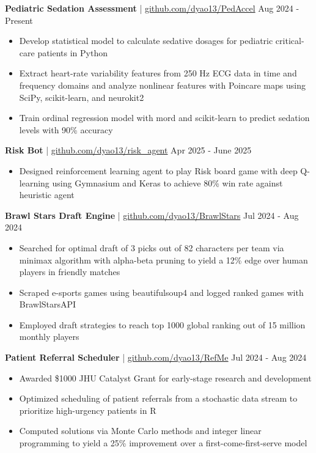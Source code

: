 \documentclass[11pt]{article}       %
\begin{document}
\textbf{Pediatric Sedation Assessment} | \href{https://github.com/dyao13/PedAccel}{github.com/dyao13/PedAccel} \hfill Aug 2024 - Present \vspace{-9pt} \\
\begin{itemize}
  \item Develop statistical model to calculate sedative dosages for pediatric critical-care patients in Python
  \item Extract heart-rate variability features from 250 Hz ECG data in time and frequency domains and analyze nonlinear features with Poincare maps using SciPy, scikit-learn, and neurokit2
  \item Train ordinal regression model with mord and scikit-learn to predict sedation levels with 90\% accuracy
\end{itemize}

\textbf{Risk Bot} | \href{https://github.com/dyao13/risk_agent}{github.com/dyao13/risk\_agent} \hfill Apr 2025 - June 2025 \vspace{-9pt} \\
\begin{itemize}
  \item Designed reinforcement learning agent to play Risk board game with deep Q-learning using Gymnasium and Keras to achieve 80\% win rate against heuristic agent
\end{itemize}

\textbf{Brawl Stars Draft Engine} | \href{https://github.com/dyao13/BrawlStars}{github.com/dyao13/BrawlStars} \hfill Jul 2024 - Aug 2024 \vspace{-9pt} \\
\begin{itemize}
  \item Searched for optimal draft of 3 picks out of 82 characters per team via minimax algorithm with alpha-beta pruning to yield a 12\% edge over human players in friendly matches
  \item Scraped e-sports games using beautifulsoup4 and logged ranked games with BrawlStarsAPI
  \item Employed draft strategies to reach top 1000 global ranking out of 15 million monthly players
\end{itemize}

\textbf{Patient Referral Scheduler} | \href{https://github.com/dyao13/RefMe}{github.com/dyao13/RefMe} \hfill Jul 2024 - Aug 2024 \vspace{-9pt} \\
\begin{itemize}
  \item Awarded \$1000 JHU Catalyst Grant for early-stage research and development
  \item Optimized scheduling of patient referrals from a stochastic data stream to prioritize high-urgency patients in R
  \item Computed solutions via Monte Carlo methods and integer linear programming to yield a 25\% improvement over a first-come-first-serve model
\end{itemize}
\end{document}
